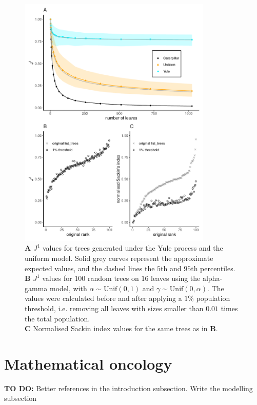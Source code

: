 \begin{figure}[h]
    \centering
    \includegraphics[width=0.82\textwidth]{Chapter_1/figures/old_j1_paper_figure.pdf}
    \caption{\textbf{A} $J^1$ values for trees generated under the Yule process and
    the uniform model. Solid grey curves represent the approximate expected values, and
    the dashed lines the $5$th and $95$th percentiles. \\
    \textbf{B} $J^1$ values for $100$ random
    trees on $16$ leaves using the alpha-gamma model, with $\alpha\sim \text{Unif}(0,1)$
    and $\gamma\sim \text{Unif}(0,\alpha)$. The values were
    calculated before and after applying a $1\%$ population threshold, i.e. removing all leaves
    with sizes smaller than $0.01$ times the total population.\\
    \textbf{C} Normalised Sackin index values for the same trees as in \textbf{B}.}
    \label{fig:robustness}
\end{figure}
\clearpage


\section{Mathematical oncology}
\textbf{TO DO:} Better references in the introduction subsection. Write the modelling subsection
